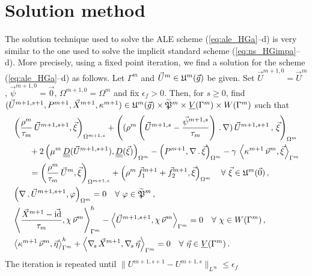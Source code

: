 \section{Solution method}\label{sec:ale_solution_method}
The solution technique used to solve the ALE scheme (\ref{eq:ale_HGa}--d) is
very similar to the one used to solve the implicit standard scheme
(\ref{eq:ns_HGimpa}--d). More precisely, using a fixed point iteration, we find
a solution for the scheme (\ref{eq:ale_HGa}--d) as follows. Let $\Gamma^m$
and $\vec U^m\in \uspacediscale{g}{m}$ be given.
Set $\vec U^{m+1,0}=\vec U^m$, $\vec \psi^{m+1,0} =
\vec 0$, $\Omega^{m+1,0}=\Omega^m$ and fix $\epsilon_f > 0$.
Then, for $s \geq 0$,
find $(\vec U^{m+1,s+1},P^{m+1}, \vec X^{m+1}, \kappa^{m+1}) \in
\uspacediscale{g}{m}\times \pnormspaceale^m \times \Vh \times \Wh$ such that
\begin{subequations}
\begin{align}
& \left( \frac{\rho^m}{\tau_m}\,\vec U^{m+1,s+1}, \vec
\xi\right)_{\Omega^{m+1,s}} + \left((\rho^m\left(\vec
U^{m+1,s}-\frac{\vec\psi^{m+1,s}}{\tau_m}\right)\,.\,\nabla)\,
\vec U^{m+1,s+1}\,, \,\vec \xi \right)_{\Omega^m}\nonumber \\
& \qquad + 2\left(\mu^m\,\mat D(\vec U^{m+1,s+1}), \mat D(\vec \xi)
\right)_{\Omega^m} - \left(P^{m+1}, \nabla\,.\,\vec \xi\right)_{\Omega^m}
- \gamma\,\left\langle \kappa^{m+1}\,\vec\nu^m,\vec\xi\right\rangle_{\Gamma^m}
\nonumber \\
& \qquad = \left(\frac{\rho^m}{\tau_m}\,\vec U^m,\vec \xi
\right)_{\Omega^{m+1,s}}
+ \left(\rho^m\,\vec f_1^{m+1}+\vec f_2^{m+1}, \vec \xi\right)_{\Omega^m}
\quad \forall\ \vec\xi \in \uspacediscale{0}{m}\,, \label{eq:ns_HGalea} \\
& \left(\nabla\,.\,\vec U^{m+1,s+1}, \varphi\right)_{\Omega^m}  = 0
\quad \forall\ \varphi \in \pnormspaceale^m\,,\label{eq:ns_HGaleb} \\
&  \left\langle \frac{\vec X^{m+1} - \vec\id}{\tau_m} ,\chi\,\vec\nu^m
\right\rangle_{\Gamma^m}^h - \left\langle \vec U^{m+1,s+1}, \chi\,\vec\nu^m
\right\rangle_{\Gamma^m}  = 0 \quad \forall\ \chi \in \Wh\,,
\label{eq:ns_HGalec}\\
& \left\langle \kappa^{m+1}\,\vec\nu^m, \vec\eta \right\rangle_{\Gamma^m}^h
+ \left\langle \nabs\,\vec X^{m+1}, \nabs\,\vec \eta \right\rangle_{\Gamma^m} =
0 \quad \forall\ \vec\eta \in \Vh\,. \label{eq:ns_HGaled}
\end{align}
\end{subequations}
The iteration is repeated
until $\|U^{m+1,s+1}-U^{m+1,s}\|_{L^\infty} \leq\epsilon_f$
